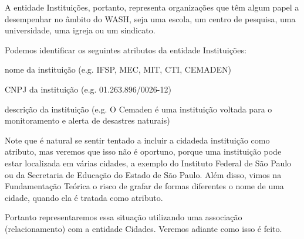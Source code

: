 \documentclass[
12pt,		%
openright,	%
twoside,  %
a4paper,			%
chapter=TITLE,		%
english,			%
french,				%
spanish,			%
brazil				%
]{USPSC-classe/USPSC}
\begin{document}
\noindent\begin{center}\mbox{\centering{}}\end{center}


A entidade \textquotedbl Institui\c{c}\~oes\textquotedbl , portanto, representa organiza\c{c}\~oes que t\^em algum papel a desempenhar no \^ambito do WASH, seja uma escola, um centro de pesquisa, uma universidade, uma igreja ou um sindicato.









Podemos identificar os seguintes atributos da entidade \textquotedbl Institui\c{c}\~oes\textquotedbl :










\begin{alineas}
\item nome da institui\c{c}\~ao (e.g. IFSP, MEC, MIT, CTI, CEMADEN)
\item CNPJ da institui\c{c}\~ao (e.g.  01.263.896/0026-12)
\item descri\c{c}\~ao da institui\c{c}\~ao (e.g. \textquotedbl O Cemaden \'e uma institui\c{c}\~ao voltada para o monitoramento e alerta de desastres naturais\textquotedbl )
\end{alineas}

Note que \'e natural se sentir tentado a incluir a \textquotedbl cidade\textquotedbl  da institui\c{c}\~ao como atributo, mas veremos que isso n\~ao \'e oportuno, porque uma institui\c{c}\~ao pode estar localizada em v\'arias cidades, a exemplo do Instituto Federal de S\~ao Paulo ou da Secretaria de Educa\c{c}\~ao do Estado de S\~ao Paulo. Al\'em disso, vimos na Fundamenta\c{c}\~ao Te\'orica o risco de grafar de formas diferentes o nome de uma cidade, quando ela \'e tratada como atributo.









Portanto representaremos essa situa\c{c}\~ao utilizando uma associa\c{c}\~ao (relacionamento) com a entidade \textquotedbl Cidades\textquotedbl . Veremos adiante como isso \'e feito.
\end{document}
